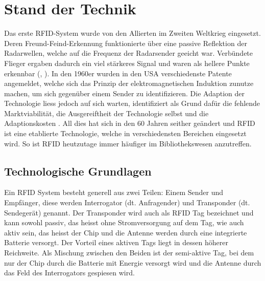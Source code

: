 \chapter{Stand der Technik}
\label{ch:StandDerTechnik}

Das erste \gls{RFID}-System wurde von den Allierten im Zweiten Weltkrieg eingesetzt. Deren Freund-Feind-Erkennung funktionierte über eine passive Reflektion der Radarwellen, welche auf die Frequenz der Radarsender geeicht war. Verbündete Flieger ergaben dadurch ein viel stärkeres Signal und waren als hellere Punkte erkennbar (\cite{chawla2007}, \cite{uswardep1946_3}). In den 1960er wurden in den USA verschiedenste Patente angemeldet, welche sich das Prinzip der elektromagnetischen Induktion zunutze machen, um sich gegenüber einem Sender zu identifizieren. Die Adaption der Technologie liess jedoch auf sich warten, \citeauthor{want2004} identifiziert als Grund dafür die fehlende Marktviabilität, die Ausgereiftheit der Technologie selbst und die Adaptionskosten \parencite{want2004}. All dies hat sich in den 60 Jahren seither geändert und \gls{RFID} ist eine etablierte Technologie, welche in verschiedensten Bereichen eingesetzt wird. So ist \gls{RFID} heutzutage immer häufiger im Bibliothekswesen anzutreffen.

\section{Technologische Grundlagen}

Ein \gls{RFID} System besteht generell aus zwei Teilen: Einem Sender und Empfänger, diese werden Interrogator (dt. Anfragender) und Transponder (dt. Sendegerät) genannt. Der Transponder wird auch als \gls{RFID} Tag bezeichnet und kann sowohl passiv, das heisst ohne Stromversorgung auf dem Tag, wie auch aktiv sein, das heisst der Chip und die Antenne werden durch eine integrierte Batterie versorgt. Der Vorteil eines aktiven Tags liegt in dessen höherer Reichweite. Als Mischung zwischen den Beiden ist der semi-aktive Tag, bei dem nur der Chip durch die Batterie mit Energie versorgt wird und die Antenne durch das Feld des Interrogators gespiesen wird.

